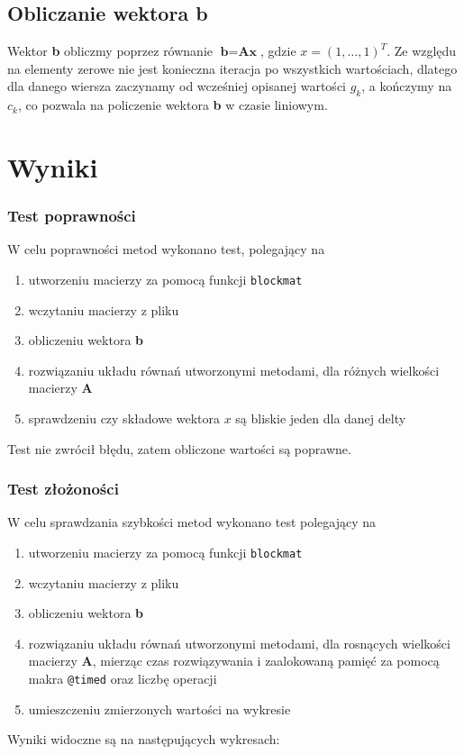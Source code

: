 \documentclass[12pt]{article}
\begin{document}
\subsection*{Obliczanie wektora b}
Wektor \textbf{b} obliczmy poprzez równanie $\textbf{b} = \textbf{A} \textbf{x}$, gdzie $x = (1, \dots, 1)^T$. Ze względu na elementy zerowe nie jest konieczna iteracja po wszystkich wartościach, dlatego dla danego wiersza zaczynamy od wcześniej opisanej wartości $g_k$, a kończymy na $c_k$, co pozwala na policzenie wektora \textbf{b} w czasie liniowym.

\section{Wyniki}
\subsubsection*{Test poprawności}
W celu poprawności metod wykonano test, polegający na
\begin{enumerate}
	\item utworzeniu macierzy za pomocą funkcji \texttt{blockmat}
	\item wczytaniu macierzy z pliku
	\item obliczeniu wektora \textbf{b}
	\item rozwiązaniu układu równań utworzonymi metodami, dla różnych wielkości macierzy \textbf{A}
	\item sprawdzeniu czy składowe wektora $x$ są bliskie jeden dla danej delty
\end{enumerate}
Test nie zwrócił błędu, zatem obliczone wartości są poprawne.
\subsubsection*{Test złożoności}
W celu sprawdzania szybkości metod wykonano test polegający na
\begin{enumerate}
	\item utworzeniu macierzy za pomocą funkcji \texttt{blockmat}
	\item wczytaniu macierzy z pliku
	\item obliczeniu wektora \textbf{b}
	\item rozwiązaniu układu równań utworzonymi metodami, dla rosnących wielkości macierzy \textbf{A}, mierząc czas rozwiązywania i zaalokowaną pamięć za pomocą makra \texttt{@timed} oraz liczbę operacji
	\item umieszczeniu zmierzonych wartości na wykresie
\end{enumerate}
Wyniki widoczne są na następujących wykresach:
\end{document}
